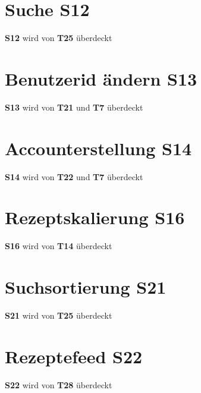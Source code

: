 \section{Suche \textbf{S12}}
\textbf{S12} wird von \textbf{T25} überdeckt

\section{Benutzerid ändern \textbf{S13}}
\textbf{S13} wird von \textbf{T21} und \textbf{T7} überdeckt

\section{Accounterstellung \textbf{S14}}
\textbf{S14} wird von \textbf{T22} und \textbf{T7} überdeckt

\section{Rezeptskalierung \textbf{S16}}
\textbf{S16} wird von \textbf{T14} überdeckt

\section{Suchsortierung \textbf{S21}}
\textbf{S21} wird von \textbf{T25} überdeckt

\section{Rezeptefeed \textbf{S22}}
\textbf{S22} wird von \textbf{T28} überdeckt








